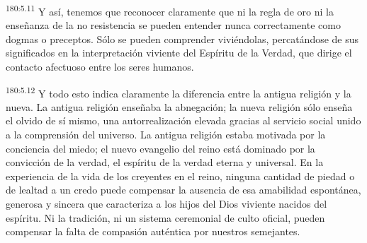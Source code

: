 \par
\textsuperscript{180:5.11} Y así, tenemos que reconocer claramente que ni la regla de oro ni la enseñanza de la no resistencia se pueden entender nunca correctamente como dogmas o preceptos. Sólo se pueden comprender viviéndolas, percatándose de sus significados en la interpretación viviente del Espíritu de la Verdad, que dirige el contacto afectuoso entre los seres humanos.

\par
\textsuperscript{180:5.12} Y todo esto indica claramente la diferencia entre la antigua religión y la nueva. La antigua religión enseñaba la abnegación; la nueva religión sólo enseña el olvido de sí mismo, una autorrealización elevada gracias al servicio social unido a la comprensión del universo. La antigua religión estaba motivada por la conciencia del miedo; el nuevo evangelio del reino está dominado por la convicción de la verdad, el espíritu de la verdad eterna y universal. En la experiencia de la vida de los creyentes en el reino, ninguna cantidad de piedad o de lealtad a un credo puede compensar la ausencia de esa amabilidad espontánea, generosa y sincera que caracteriza a los hijos del Dios viviente nacidos del espíritu. Ni la tradición, ni un sistema ceremonial de culto oficial, pueden compensar la falta de compasión auténtica por nuestros semejantes.

